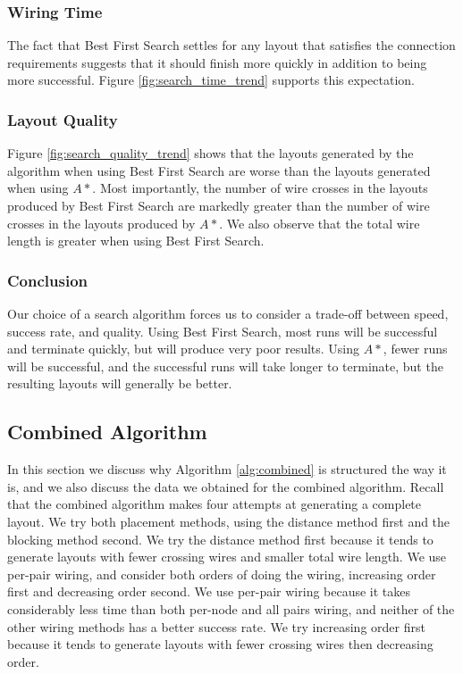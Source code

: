 \subsubsection{Wiring Time}
The fact that Best First Search settles for any layout that satisfies the
connection
requirements suggests that it should finish more quickly in addition to being
more successful. Figure \ref{fig:search_time_trend} supports this
expectation.

\subsubsection{Layout Quality}
Figure \ref{fig:search_quality_trend} shows that the layouts generated by the
algorithm when using Best First Search are worse than the layouts generated
when using $A*$. Most importantly, the
number of wire crosses in the layouts produced by Best First Search are markedly
greater than the number of wire crosses in the layouts produced by $A*$. We also
observe that the total wire length is greater when using Best First Search.

\subsubsection{Conclusion}
Our choice of a search algorithm forces us to consider a trade-off between
speed, success rate, and quality.
Using Best First Search, most runs will be successful
and terminate quickly, but will produce very poor results. Using $A*$,
fewer runs will be successful, and the successful runs will take longer to
terminate, but the resulting layouts will generally be better.

\subsection{Combined Algorithm}
\label{sec:method_combination}

In this section we discuss why Algorithm
\ref{alg:combined} is structured the way it is, and we also
discuss the data we obtained for the combined algorithm. Recall that the combined
algorithm makes four attempts at generating a complete layout. We try both
placement methods, using the distance method first and the blocking method
second. We
try the distance method first because it tends to generate layouts with fewer
crossing wires and smaller total wire length. We use per-pair wiring, and
consider both orders of doing the wiring, increasing order first and decreasing
order second. We use per-pair wiring because it takes considerably
less time than both per-node and all pairs wiring, and neither of the other
wiring methods has a better success rate. We try increasing order first because
it tends to generate layouts with fewer crossing wires then decreasing order.

